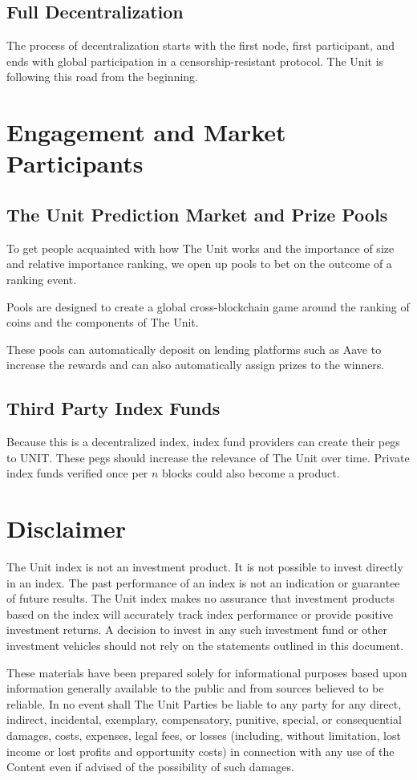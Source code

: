 \documentclass[12pt]{article}
\begin{document}
\subsection{Full Decentralization}

The process of decentralization starts with the first node, first participant, and ends with global participation in a censorship-resistant protocol. The Unit is following this road from the beginning.

\section{Engagement and Market Participants}

\subsection{The Unit Prediction Market and Prize Pools}

To get people acquainted with how The Unit works and the importance of size and relative importance ranking, we open up pools to bet on the outcome of a ranking event.

Pools are designed to create a global cross-blockchain game around the ranking of coins and the components of The Unit.

These pools can automatically deposit on lending platforms such as Aave to increase the rewards and can also automatically assign prizes to the winners.

\subsection{Third Party Index Funds}

Because this is a decentralized index, index fund providers can create their pegs to UNIT. These pegs should increase the relevance of The Unit over time. Private index funds verified once per $n$ blocks could also become a product. 


\section{Disclaimer}

The Unit index is not an investment product. It is not possible to invest directly in an index. The past performance of an index is not an indication or guarantee of future results. The Unit index makes no assurance that investment products based on the index will accurately track index performance or provide positive investment returns. A decision to invest in any such investment fund or other investment vehicles should not rely on the statements outlined in this document. 

These materials have been prepared solely for informational purposes based upon information generally available to the public and from sources believed to be reliable. In no event shall The Unit Parties be liable to any party for any direct, indirect, incidental, exemplary, compensatory, punitive, special, or consequential damages, costs, expenses, legal fees, or losses (including, without limitation, lost income or lost profits and opportunity costs) in connection with any use of the Content even if advised of the possibility of such damages.
\end{document}
